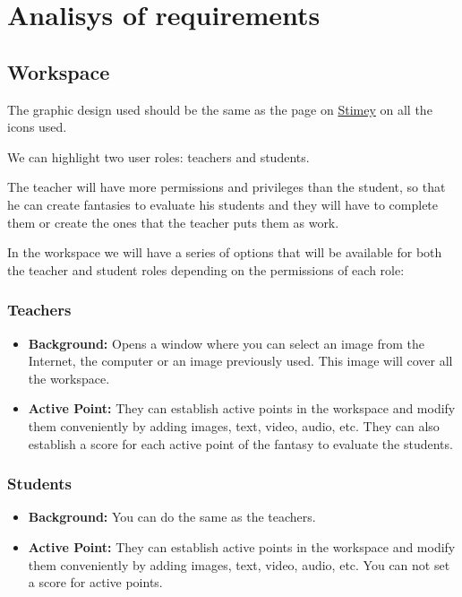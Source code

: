 \chapter{Analisys of requirements}
\section{Workspace}
The graphic design used should be the same as the page on \href{https://stimey.eu/home}{Stimey} on all the icons used.

We can highlight two user roles: teachers and students.

The teacher will have more permissions and privileges than the student, so that he can create fantasies to evaluate his students and they will have to complete them or create the ones that the teacher puts them as work.

In the workspace we will have a series of options that will be available for both the teacher and student roles depending on the permissions of each role:

\subsection{Teachers}
\begin{itemize}
	\item \textbf{Background:} Opens a window where you can select an image from the Internet, the computer or an image previously used. This image will cover all the workspace.
	\item \textbf{Active Point:} They can establish active points in the workspace and modify them conveniently by adding images, text, video, audio, etc. They can also establish a score for each active point of the fantasy to evaluate the students.
\end{itemize}

\subsection{Students}
\begin{itemize}
	\item \textbf{Background:} You can do the same as the teachers.
	\item \textbf{Active Point:} They can establish active points in the workspace and modify them conveniently by adding images, text, video, audio, etc. You can not set a score for active points.
\end{itemize}

